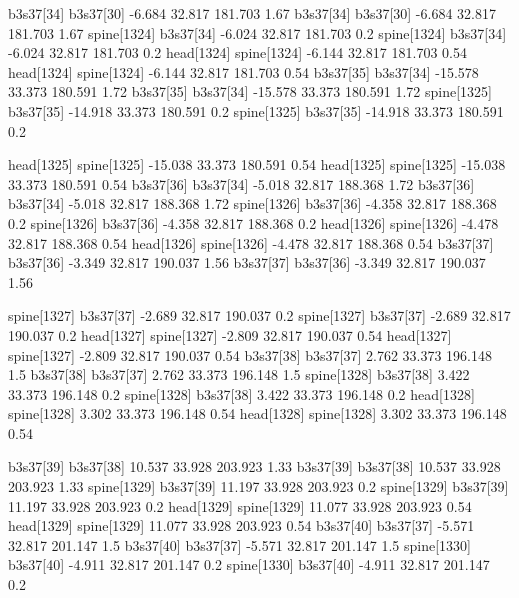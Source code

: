 b3s37[34]    b3s37[30]    -6.684    32.817    181.703    1.67
b3s37[34]    b3s37[30]    -6.684    32.817    181.703    1.67
spine[1324]    b3s37[34]    -6.024    32.817    181.703    0.2
spine[1324]    b3s37[34]    -6.024    32.817    181.703    0.2
head[1324]    spine[1324]    -6.144    32.817    181.703    0.54
head[1324]    spine[1324]    -6.144    32.817    181.703    0.54
b3s37[35]    b3s37[34]    -15.578    33.373    180.591    1.72
b3s37[35]    b3s37[34]    -15.578    33.373    180.591    1.72
spine[1325]    b3s37[35]    -14.918    33.373    180.591    0.2
spine[1325]    b3s37[35]    -14.918    33.373    180.591    0.2


head[1325]    spine[1325]    -15.038    33.373    180.591    0.54
head[1325]    spine[1325]    -15.038    33.373    180.591    0.54
b3s37[36]    b3s37[34]    -5.018    32.817    188.368    1.72
b3s37[36]    b3s37[34]    -5.018    32.817    188.368    1.72
spine[1326]    b3s37[36]    -4.358    32.817    188.368    0.2
spine[1326]    b3s37[36]    -4.358    32.817    188.368    0.2
head[1326]    spine[1326]    -4.478    32.817    188.368    0.54
head[1326]    spine[1326]    -4.478    32.817    188.368    0.54
b3s37[37]    b3s37[36]    -3.349    32.817    190.037    1.56
b3s37[37]    b3s37[36]    -3.349    32.817    190.037    1.56


spine[1327]    b3s37[37]    -2.689    32.817    190.037    0.2
spine[1327]    b3s37[37]    -2.689    32.817    190.037    0.2
head[1327]    spine[1327]    -2.809    32.817    190.037    0.54
head[1327]    spine[1327]    -2.809    32.817    190.037    0.54
b3s37[38]    b3s37[37]    2.762    33.373    196.148    1.5
b3s37[38]    b3s37[37]    2.762    33.373    196.148    1.5
spine[1328]    b3s37[38]    3.422    33.373    196.148    0.2
spine[1328]    b3s37[38]    3.422    33.373    196.148    0.2
head[1328]    spine[1328]    3.302    33.373    196.148    0.54
head[1328]    spine[1328]    3.302    33.373    196.148    0.54


b3s37[39]    b3s37[38]    10.537    33.928    203.923    1.33
b3s37[39]    b3s37[38]    10.537    33.928    203.923    1.33
spine[1329]    b3s37[39]    11.197    33.928    203.923    0.2
spine[1329]    b3s37[39]    11.197    33.928    203.923    0.2
head[1329]    spine[1329]    11.077    33.928    203.923    0.54
head[1329]    spine[1329]    11.077    33.928    203.923    0.54
b3s37[40]    b3s37[37]    -5.571    32.817    201.147    1.5
b3s37[40]    b3s37[37]    -5.571    32.817    201.147    1.5
spine[1330]    b3s37[40]    -4.911    32.817    201.147    0.2
spine[1330]    b3s37[40]    -4.911    32.817    201.147    0.2


